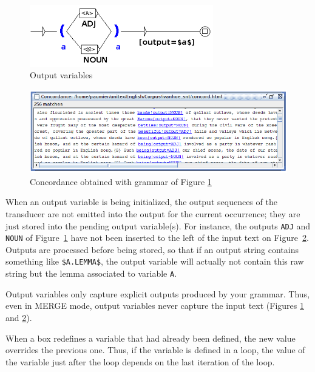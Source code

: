 \begin{figure}[!ht]
\begin{center}
\includegraphics[width=8cm]{resources/img/fig6-17r.png}
\caption{Output variables\label{fig-output-variables}}
\end{center}
\end{figure}

\begin{figure}[!ht]
\begin{center}
\includegraphics[width=15cm]{resources/img/fig6-17s.png}
\caption{Concordance obtained with grammar of Figure \ref{fig-output-variables}\label{fig-output-variables-concord}}
\end{center}
\end{figure}

\bigskip
\noindent When an output variable is being initialized, the output sequences
of the transducer
are not emitted into the output for the current occurrence; they are just stored into the pending output variable(s).
For instance, the outputs \verb+ADJ+ and \verb+NOUN+  of  Figure~\ref{fig-output-variables}
have not been inserted to the left of the input text
on Figure~\ref{fig-output-variables-concord}.
Outputs are processed before being stored, so that if an output string contains something like \verb+$A.LEMMA$+,
the output variable will actually not contain this raw string but the lemma associated to variable \verb+A+.

\bigskip
\noindent Output variables only capture explicit outputs produced by your grammar. Thus, even 
in MERGE mode, output variables never capture the input text
(Figures \ref{fig-output-variables} and \ref{fig-output-variables-concord}).

\bigskip
\noindent When a box redefines a variable that had already been defined,
 the new value overrides the previous one.
Thus, if the variable is defined in a loop,
the value of the variable just after the loop depends on the last iteration of the loop.



